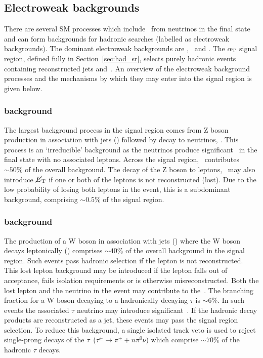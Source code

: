 \subsection{Electroweak backgrounds}
\label{sec:ewk-background-intro}
There are several SM processes which include \met~from neutrinos in the final state
and can form backgrounds for hadronic searches (labelled as electroweak backgrounds). The dominant electroweak
backgrounds are \wj, \ttj~and \zj. The $\alpha_{\text{T}}$ signal region, defined fully in 
Section~\ref{sec:had_sr}, selects purely hadronic events
containing reconstructed jets and~\met. An overview of the electroweak background processes 
and the mechanisms by which they may enter into the signal region is given below. 

\subsubsection{\zj background}

The largest background process in the signal region comes from Z boson production
in association with jets (\zj) followed by decay to neutrinos, \znunu. This process is 
an `irreducible' background as the neutrinos produce significant \met~in the final 
state with no associated leptons. Across the signal region, \znunu~contributes $\sim 50\%$ of 
the overall background. The decay of the Z boson to leptons, \zll~may also introduce $\mbox{$\cancel{E}_\text{T}$}$ if 
one or both of the leptons is not reconstructed (lost). Due to the low probability of
losing both leptons in the event, this is a subdominant background, comprising $\sim 0.5\%$ of the signal region.

\subsubsection{\wj background}

The production of a W boson in association with jets (\wj) where the W boson decays leptonically
(\wl) comprises $\sim 40\%$ of the overall background in the signal region. 
Such events pass hadronic selection if the lepton is not reconstructed.
This lost lepton background may be introduced if the lepton falls out of acceptance,
fails isolation requirements or is otherwise misreconstructed. Both the lost lepton 
and the neutrino in the event may contribute to the~\met. 
The branching fraction for a W boson decaying to a hadronically decaying $\tau$ is $\sim6\%$.
In such events the associated $\tau$ neutrino may introduce significant~\met. If the hadronic
decay products are reconstructed as a jet, these events may pass the signal region selection.
To reduce this background, a single isolated track veto is used to reject single-prong decays of the 
$\tau$~($\tau^{\pm}\rightarrow\pi^{\pm}+n\pi^{0}\nu$) which comprise $\sim70\%$ of the hadronic $\tau$ decays.

